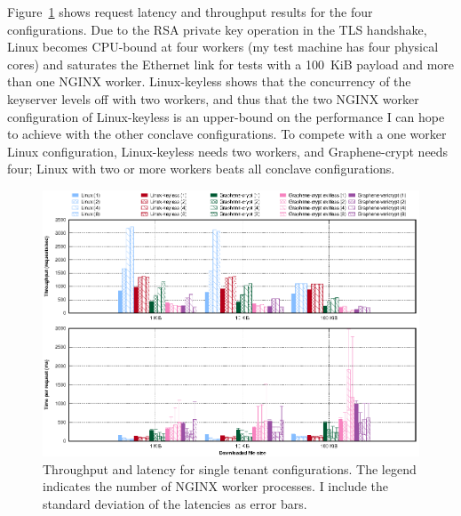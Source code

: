 Figure~\ref{fig:macrobench-single-tenant-lat-throughput} shows
request latency and throughput results for the four configurations.
%
Due to the RSA private key operation in the TLS handshake, Linux becomes
CPU-bound at four workers (my test machine has four physical cores) and
saturates the Ethernet link for tests with a 100~KiB payload and more than one
NGINX worker.
%
Linux-keyless shows that the concurrency of the keyserver levels
off with two workers, and thus that the two NGINX worker configuration of
Linux-keyless is an upper-bound on the performance I can hope to achieve
with the other conclave configurations.
%
%
To compete with a one worker Linux configuration, Linux-keyless needs two
workers, and Graphene-crypt needs four; Linux with two or more workers beats
all conclave configurations.


\begin{figure}[t]
	\centering
    \includegraphics[width=\textwidth]{figs/macrobench-single-tenant-lat-throughput}
	\caption{Throughput and latency for single tenant configurations.
    The legend indicates the number of NGINX worker processes.
    I include the standard deviation of the latencies as error bars.}
	\vspace*{-4pt}
    \label{fig:macrobench-single-tenant-lat-throughput}
\end{figure}
